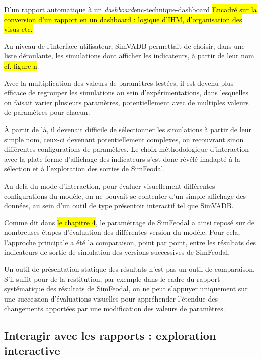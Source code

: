 	\begin{encadre}{D'un rapport automatique à un \textit{dashboard}}{enc-technique-dashboard}
		\hl{Encadré sur la conversion d'un rapport en un dashboard : logique d'IHM, d'organisation des visus etc.}
	\end{encadre}

	Au niveau de l'interface utilisateur, SimVADB permettait de choisir, dans une liste déroulante, les simulations dont afficher les indicateurs, à partir de leur nom \hl{cf. figure n}.

	Avec la multiplication des valeurs de paramètres testées, il est devenu plus efficace de regrouper les simulations au sein d'expérimentations, dans lesquelles on faisait varier plusieurs paramètres, potentiellement avec de multiples valeurs de paramètres pour chacun.

	À partir de là, il devenait difficile de sélectionner les simulations à partir de leur simple nom, ceux-ci devenant potentiellement complexes, ou recouvrant sinon différentes configurations de paramètres.
	Le choix méthodologique d'interaction avec la plate-forme d'affichage des indicateurs s'est donc révélé inadapté à la sélection et à l'exploration des sorties de SimFeodal.

	Au delà du mode d'interaction, pour évaluer visuellement différentes configurations du modèle, on ne pouvait se contenter d'un simple affichage des données, au sein d'un outil de type présentoir interactif tel que SimVADB.

	Comme dit dans \hl{le chapitre 4}, le paramétrage de SimFeodal a ainsi reposé sur de nombreuses étapes d'évaluation des différentes version du modèle.
	Pour cela, l'approche principale a été la comparaison, point par point, entre les résultats des indicateurs de sortie de simulation des versions successives de SimFeodal.

	Un outil de présentation statique des résultats n'est pas un outil de comparaison.
	S'il suffit pour de la restitution, par exemple dans le cadre du rapport systématique des résultats de SimFeodal, on ne peut s'appuyer uniquement sur une succession d'évaluations visuelles pour appréhender l'étendue des changements apportées par une modification des valeurs de paramètres.

	\subsection{Interagir avec les rapports : exploration interactive}\label{subsec:explo-interactive}

